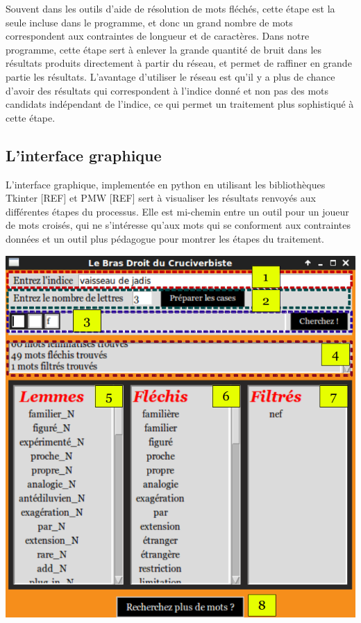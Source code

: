 Souvent dans les outils d'aide de résolution de mots fléchés, cette étape est la seule incluse dans le programme, et donc un grand nombre de mots correspondent aux contraintes de longueur et de caractères. Dans notre programme, cette étape sert à enlever la grande quantité de bruit dans les résultats produits directement à partir du réseau, et permet de raffiner en grande partie les résultats. L'avantage d'utiliser le réseau est qu'il y a plus de chance d'avoir des résultats qui correspondent à l'indice donné et non pas des mots candidats indépendant de l'indice, ce qui permet un traitement plus sophistiqué à cette étape.

\subsection{L'interface graphique}

L'interface graphique, implementée en python en utilisant les bibliothèques Tkinter [REF] et PMW [REF] sert à visualiser les résultats renvoyés aux différentes étapes du processus. Elle est mi-chemin entre un outil pour un joueur de mots croisés, qui ne s'intéresse qu'aux mots qui se conforment aux contraintes données et un outil plus pédagogue pour montrer les étapes du traitement.

\begin{center}
\includegraphics{CrossWordInterface.png}
\end{center}

